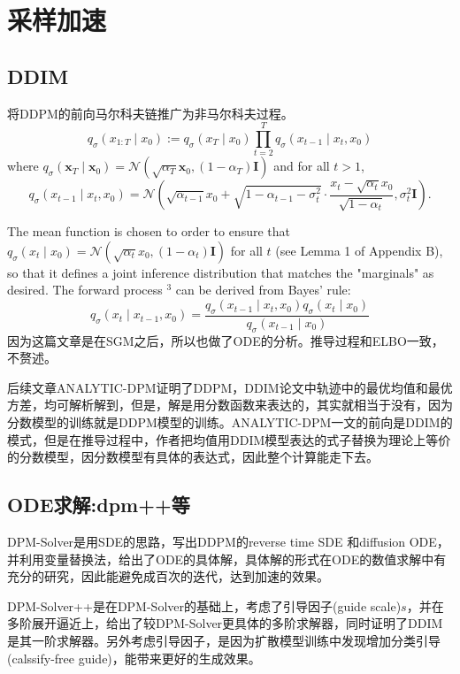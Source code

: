\documentclass[lang=cn,newtx,10pt,scheme=chinese]{elegantbook}
\begin{document}
\section{采样加速}
\subsection{DDIM}
将DDPM的前向马尔科夫链推广为非马尔科夫过程。
$$
q_\sigma\left(x_{1: T} \mid x_0\right):=q_\sigma\left(x_T \mid x_0\right) \prod_{t=2}^T q_\sigma\left(x_{t-1} \mid x_t, x_0\right)
$$
where $q_\sigma\left(\boldsymbol{x}_T \mid \boldsymbol{x}_0\right)=\mathcal{N}\left(\sqrt{\alpha_T} \boldsymbol{x}_0,\left(1-\alpha_T\right) \boldsymbol{I}\right)$ and for all $t>1$,
$$
q_\sigma\left(x_{t-1} \mid x_t, x_0\right)=\mathcal{N}\left(\sqrt{\alpha_{t-1}} x_0+\sqrt{1-\alpha_{t-1}-\sigma_t^2} \cdot \frac{x_t-\sqrt{\alpha_t} x_0}{\sqrt{1-\alpha_t}}, \sigma_t^2 \boldsymbol{I}\right) .
$$

The mean function is chosen to order to ensure that $q_\sigma\left(x_t \mid x_0\right)=\mathcal{N}\left(\sqrt{\alpha_t} x_0,\left(1-\alpha_t\right) \boldsymbol{I}\right)$ for all $t$ (see Lemma 1 of Appendix B), so that it defines a joint 
inference distribution that matches the "marginals" as desired. The forward process ${ }^3$ can be derived from Bayes' rule:
$$
q_\sigma\left(x_t \mid x_{t-1}, x_0\right)=\frac{q_\sigma\left(x_{t-1} \mid x_t, x_0\right) q_\sigma\left(x_t \mid x_0\right)}{q_\sigma\left(x_{t-1} \mid x_0\right)}
$$
因为这篇文章是在SGM之后，所以也做了ODE的分析。推导过程和ELBO一致，不赘述。

后续文章ANALYTIC-DPM证明了DDPM，DDIM论文中轨迹中的最优均值和最优方差，均可解析解到，但是，解是用分数函数来表达的，其实就相当于没有，因为分数模型的训练就是DDPM模型的训练。ANALYTIC-DPM一文的前向是DDIM的模式，但是在推导过程中，作者把均值用DDIM模型表达的式子替换为理论上等价的分数模型，因分数模型有具体的表达式，因此整个计算能走下去。

\subsection{ODE求解:dpm++等}
DPM-Solver是用SDE的思路，写出DDPM的reverse time SDE 和diffusion  ODE，并利用变量替换法，给出了ODE的具体解，具体解的形式在ODE的数值求解中有充分的研究，因此能避免成百次的迭代，达到加速的效果。

DPM-Solver++是在DPM-Solver的基础上，考虑了引导因子(guide scale)$s$，并在多阶展开逼近上，给出了较DPM-Solver更具体的多阶求解器，同时证明了DDIM是其一阶求解器。另外考虑引导因子，是因为扩散模型训练中发现增加分类引导(calssify-free guide)，能带来更好的生成效果。
\end{document}
